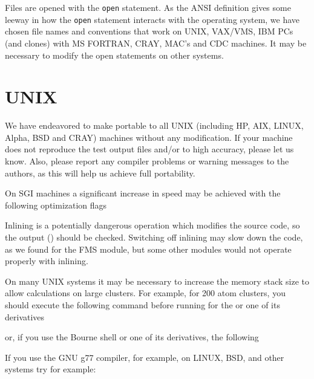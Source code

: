 \documentclass[11pt,oneside]{report} %
\begin{document}
Files are opened with the \texttt{open} statement.  As the ANSI
definition gives some leeway in how the \texttt{open} statement
interacts with the operating system, we have chosen file names and
conventions that work on UNIX, VAX/VMS, IBM PCs (and clones) with MS
FORTRAN, CRAY, MAC's and CDC machines.  It may be necessary to
modify the open statements on other systems.

\section{UNIX}
\label{sec:UNIX-machines}
We have endeavored to make {\feff} portable to all UNIX (including
HP, AIX, LINUX, Alpha, BSD and CRAY) machines without any modification. 
If your machine does not reproduce the test output files 
and/or  to high accuracy,
please let us know.  Also, please report any compiler problems or warning
messages to the authors, as this will help us achieve full
portability.

On SGI machines a significant increase in speed may be achieved with
the following optimization flags
\begin{center}
\end{center}
 Inlining is a potentially dangerous operation which modifies the
source code, so the output () should be checked.
Switching off inlining may slow down the code, as we found
for the FMS module, but some other modules would not operate properly
with inlining.

On many UNIX systems it may be necessary to increase the memory stack
size to allow calculations on large clusters.  For example, for 200
atom clusters, you should execute the following command before running
{\feffcur} for the  or one of its derivatives
\begin{center}
\end{center}
\noindent or, if you use the Bourne shell or one of its
derivatives, the following
\begin{center}
\end{center}

If you use the GNU g77 compiler, for example, on LINUX, BSD, and
other systems try for example:
\begin{center}
\end{center}
\end{document}
